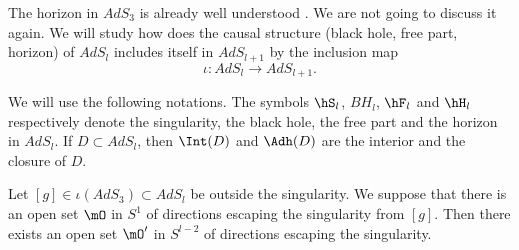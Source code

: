 The horizon in $AdS_3$ is already well understood \cite{Keio}. We are not going to discuss it again. We will study how does the causal structure (black hole, free part, horizon) of $AdS_{l}$ includes itself in $AdS_{l+1}$ by the inclusion map\cite{BTZ_horizon}
\begin{equation}
	\iota\colon AdS_l\to AdS_{l+1}.
\end{equation}

We will use the following notations. The symbols $\hS_l$, $BH_l$, $\hF_l$ and $\hH_l$ respectively denote the singularity, the black hole, the free part and the horizon in $AdS_l$. If $D\subset AdS_l$, then $\Int(D)$ and $\Adh(D)$ are the interior and the closure of $D$.

%
\begin{lemma}        \label{LONGLemMemeQueLemQuatre}
	Let $[g]\in\iota(AdS_3)\subset AdS_l$ be outside the singularity. We suppose that there is an open set $\mO$ in $S^1$ of directions escaping the singularity from $[g]$. Then there exists an open set $\mO'$ in $S^{l-2}$ of directions escaping the singularity.
\end{lemma}

